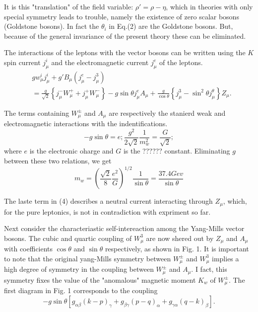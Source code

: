 It is this "translation" of the field variable: $\rho' = \rho - \eta$, which in theories with only special symmetry leads to trouble, namely the existence of zero scalar bosons (Goldstone bosons). In fact the $\theta_{i}$ in Eq.(2) are the Goldstone bosons. But, because of the general invariance of the present theory these can be eliminated.

The interactions of the leptons with the vector bosons can be written using the $K$ spin current $j^{i}_{\mu}$ and the electromagnetic current $j^{e}_{\mu}$ of the leptons.
\begin{align*}
& gw_{\mu}^{i} j_{\mu}^{i} + g' B_{\mu} (j^{e}_{\mu}- j^{3}_{\mu})\\
& = \frac{g}{\sqrt{2}}\left\{j^{-}_{\mu} W_{\mu}^{+} + j_{\mu}^{+}W^{-}_{\mu} \right\}- g \sin \theta j_{\mu}^{e} A_{\mu} + \frac{g}{\cos \theta}\left\{j^{3}_{\mu} -\sin^{2} \theta j^{\theta}_{\mu} \right\}Z_{\mu}.\tag{4}
\end{align*}

The terms containing $W^{\pm}_{\mu}$ and $A_{\mu}$ are respectively the stanierd weak and electromagnetic interactions with the indentifications.
\begin{equation*}
- g \sin \theta = e ; \frac{g^{2}}{2 \sqrt{2}} \frac{1}{m^{2}_{w}} = \frac{G}{\sqrt{2}}; \tag{5}
\end{equation*}
where $e$ is the electronic oharge and $G$ is the ?????? constant. Eliminating $g$ between these two relations, we get
\begin{equation*}
m_{w}= \left(\frac{\sqrt{2}}{8} \frac{e^{2}}{G} \right)^{1/2} \frac{1}{\sin \theta} = \frac{37.4 Gev}{\sin \theta}\tag{6}
\end{equation*}

The laste term in (4) describes a neutral current interacting through $Z_{\mu}$, which, for the pure leptonics, is not in contradiction with expriment so far.

Next consider the characteriastic self-intereaction among the Yang-Mills vector bosons. The cubic and quartic coupling of $W^{3}_{\mu}$ are now shered out by $Z_{\mu}$ and $A_{\mu}$ with coefficients $\cos \theta $ and $\sin \theta$ respectively, as shown in Fig. 1. It is important to note that the original yang-Mills symmetry between $W^{\pm}_{\mu}$ and $W^{3}_{\mu}$ implies a high degree of symmetry in the coupling between $W^{\pm}_{\mu}$ and $A_{\mu}$. I fact, this symmetry fixes the value of the "anomalous" magnetic moment $K_{w}$ of $W^{\pm}_{\mu}$. The first diagram in Fig. 1 corresponds to the coupling
$$
-g \sin \theta [g_{\alpha \beta} (k-p)_{\gamma} + g_{\beta \gamma}(p-q)_{\alpha}+ g_{\gamma \alpha} (q-k)_{\beta}].
$$

